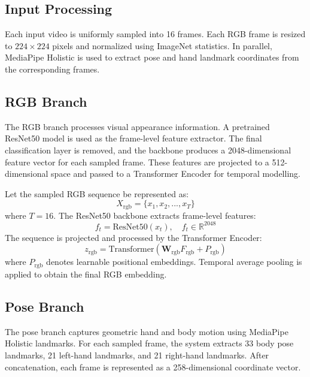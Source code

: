 \documentclass[conference]{IEEEtran}
\begin{document}
\subsection{Input Processing}

Each input video is uniformly sampled into 16 frames. Each RGB frame is resized to $224 \times 224$ pixels and normalized using ImageNet statistics. In parallel, MediaPipe Holistic is used to extract pose and hand landmark coordinates from the corresponding frames.

\subsection{RGB Branch}

The RGB branch processes visual appearance information. A pretrained ResNet50 model is used as the frame-level feature extractor. The final classification layer is removed, and the backbone produces a 2048-dimensional feature vector for each sampled frame. These features are projected to a 512-dimensional space and passed to a Transformer Encoder for temporal modelling.

Let the sampled RGB sequence be represented as:
\begin{equation}
X_{\text{rgb}} = \{x_1, x_2, ..., x_T\}
\end{equation}
where $T=16$. The ResNet50 backbone extracts frame-level features:
\begin{equation}
f_t = \text{ResNet50}(x_t), \quad f_t \in \mathbb{R}^{2048}
\end{equation}
The sequence is projected and processed by the Transformer Encoder:
\begin{equation}
z_{\text{rgb}} = \text{Transformer}(\mathbf{W}_{\text{rgb}}F_{\text{rgb}} + P_{\text{rgb}})
\end{equation}
where $P_{\text{rgb}}$ denotes learnable positional embeddings. Temporal average pooling is applied to obtain the final RGB embedding.

\subsection{Pose Branch}

The pose branch captures geometric hand and body motion using MediaPipe Holistic landmarks. For each sampled frame, the system extracts 33 body pose landmarks, 21 left-hand landmarks, and 21 right-hand landmarks. After concatenation, each frame is represented as a 258-dimensional coordinate vector.
\end{document}
